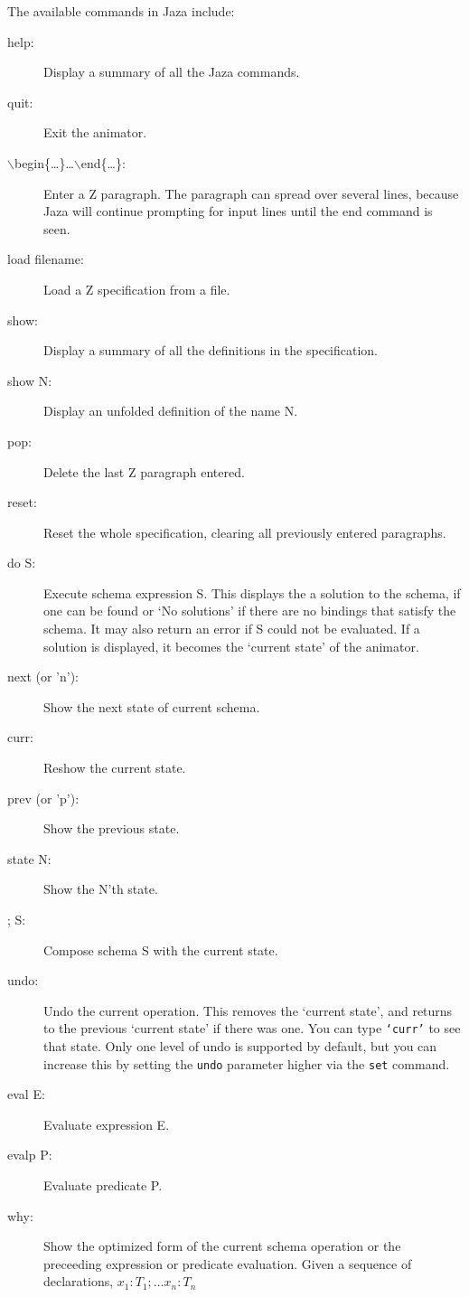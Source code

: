 \documentclass[11pt]{article}
\newcommand{\Jaza}{Jaza}
\begin{document}
The available commands in {\Jaza} include:
\begin{description}
\item[help:] Display a summary of all the {\Jaza} commands.
\item[quit:] Exit the animator.
\item[$\backslash$begin\{\ldots\}\ldots$\backslash$end\{\ldots\}:] 
  Enter a Z paragraph.  The paragraph can spread over several lines,
  because {\Jaza} will continue prompting for input lines until 
  the end command is seen.  
\item[load filename:] Load a Z specification from a file.
\item[show:] Display a summary of all the definitions in the specification.
\item[show N:] Display an unfolded definition of the name N.
\item[pop:] Delete the last Z paragraph entered.
\item[reset:] Reset the whole specification, clearing all previously
  entered paragraphs.
\item[do S:] Execute schema expression S.  This displays the
  a solution to the schema, if one can be found or `No solutions'
  if there are no bindings that satisfy the schema.  It may also
  return an error if S could not be evaluated.  If a solution
  is displayed, it becomes the `current state' of the animator.
\item[next (or 'n'):] Show the next state of current schema.
\item[curr:] Reshow the current state.
\item[prev (or 'p'):] Show the previous state.
\item[state N:] Show the N'th state.
\item[; S:] Compose schema S with the current state.
\item[undo:] Undo the current operation.  This removes the
  `current state', and returns to the previous `current state'
  if there was one.  You can type \texttt{`curr'} to see that state.
  Only one level of undo is supported by default, but you can
  increase this by setting the \texttt{undo} parameter higher
  via the \texttt{set} command.
\item[eval E:] Evaluate expression E.  
\item[evalp P:] Evaluate predicate P.  
\item[why:] Show the optimized form of the current schema operation
  or the preceeding expression or predicate evaluation.
  Given a sequence of declarations, $x_1:T_1;\ldots x_n:T_n$

\end{description}
\end{document}
